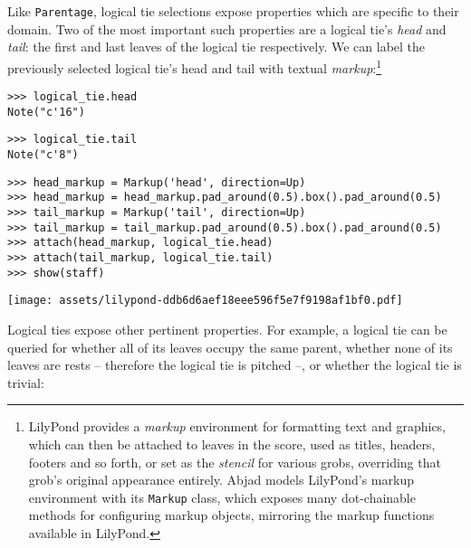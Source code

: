 \noindent Like \texttt{Parentage}, logical tie selections expose properties
which are specific to their domain. Two of the most important such properties
are a logical tie's \emph{head} and \emph{tail}: the first and last leaves of
the logical tie respectively. We can label the previously selected logical
tie's head and tail with textual \emph{markup}:\footnote{LilyPond provides a
\emph{markup} environment for formatting text and graphics, which can then be
attached to leaves in the score, used as titles, headers, footers and so forth,
or set as the \emph{stencil} for various grobs, overriding that grob's original
appearance entirely. Abjad models LilyPond's markup environment with its
\texttt{Markup} class, which exposes many dot-chainable methods for configuring
markup objects, mirroring the markup functions available in LilyPond.}

\begin{comment}
<abjad>
logical_tie.head
logical_tie.tail
head_markup = Markup('head', direction=Up)
head_markup = head_markup.pad_around(0.5).box().pad_around(0.5)
tail_markup = Markup('tail', direction=Up)
tail_markup = tail_markup.pad_around(0.5).box().pad_around(0.5)
attach(head_markup, logical_tie.head)
attach(tail_markup, logical_tie.tail)
show(staff)
</abjad>
\end{comment}

\begin{abjadbookoutput}
\begin{singlespacing}
\vspace{-0.5\baselineskip}
\begin{verbatim}
>>> logical_tie.head
Note("c'16")
\end{verbatim}
\begin{verbatim}
>>> logical_tie.tail
Note("c'8")
\end{verbatim}
\begin{verbatim}
>>> head_markup = Markup('head', direction=Up)
>>> head_markup = head_markup.pad_around(0.5).box().pad_around(0.5)
>>> tail_markup = Markup('tail', direction=Up)
>>> tail_markup = tail_markup.pad_around(0.5).box().pad_around(0.5)
>>> attach(head_markup, logical_tie.head)
>>> attach(tail_markup, logical_tie.tail)
>>> show(staff)
\end{verbatim}
\noindent\texttt{[image: assets/lilypond-ddb6d6aef18eee596f5e7f9198af1bf0.pdf]}
\end{singlespacing}
\end{abjadbookoutput}

\noindent Logical ties expose other pertinent properties. For example, a
logical tie can be queried for whether all of its leaves occupy the same
parent, whether none of its leaves are rests -- therefore the logical tie is
pitched --, or whether the logical tie is trivial:

